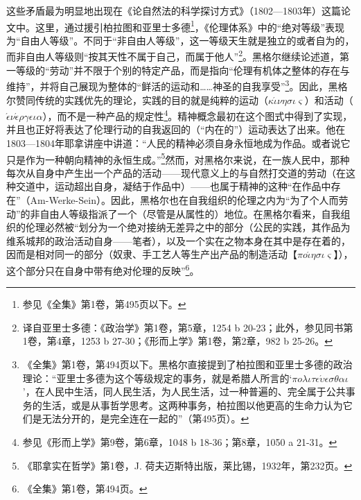这些矛盾最为明显地出现在《论自然法的科学探讨方式》（1802—1803年）这篇论文中。这里，通过援引柏拉图和亚里士多德\footnote{参见《全集》第1卷，第495页以下。}，《伦理体系》中的“绝对等级”表现为“自由人等级”。不同于“非自由人等级”，这一等级天生就是独立的或者自为的，而非自由人等级则“按其天性不属于自己，而属于他人”\footnote{译自亚里士多德：《政治学》第1卷，第5章，1254 b 20-23；此外，参见同书第1卷，第4章，1253 b 27-30；《形而上学》第1卷，第2章，982 b 25-26。}。黑格尔继续论述道，第一等级的“劳动”并不限于个别的特定产品，而是指向“伦理有机体之整体的存在与维持”，并将自己展现为整体的“鲜活的运动和……神圣的自我享受”\footnote{《全集》第1卷，第494页以下。黑格尔直接提到了柏拉图和亚里士多德的政治理论：“亚里士多德为这个等级规定的事务，就是希腊人所言的‘$\pi o \lambda \iota \tau \epsilon \acute{\upsilon} \epsilon \sigma \theta \alpha \iota$’，在人民中生活，同人民生活，为人民生活，过一种普遍的、完全属于公共事务的生活，或是从事哲学思考。这两种事务，柏拉图以他更高的生命力认为它们是无法分开的，是完全连在一起的”（第495页）。}。因此，黑格尔赞同传统的实践优先的理论，实践的目的就是纯粹的运动（$\kappa\acute{\iota}\nu\eta\sigma\iota\varsigma$）和活动（$\acute{\epsilon}\nu\acute{\epsilon}\rho\gamma\epsilon\iota\alpha$），而不是一种产品的规定性\footnote{参见《形而上学》第9卷，第6章，1048 b 18-36；第8章，1050 a 21-31。}。精神概念最初在这个图式中得到了实现，并且也正好将表达了伦理行动的自我返回的（“内在的”）运动表达了出来。他在1803—1804年耶拿讲座中讲道：“人民的精神必须自身永恒地成为作品。或者说它只是作为一种朝向精神的永恒生成。”\footnote{《耶拿实在哲学》第1卷，J. 荷夫迈斯特出版，莱比锡，1932年，第232页。}然而，对黑格尔来说，在一族人民中，那种每次从自身中产生出一个产品的活动——现代意义上的与自然打交道的劳动（在这种交道中，运动超出自身，凝结于作品中）——也属于精神的这种“在作品中存在”（Am-Werke-Sein）。因此，黑格尔也在自我组织的伦理之内为“为了个人而劳动”的非自由人等级指派了一个（尽管是从属性的）地位。在黑格尔看来，自我组织的伦理必然被“划分为一个绝对接纳无差异之中的部分（公民的实践，其作品为维系城邦的政治活动自身——笔者），以及一个实在之物本身在其中是存在着的，因而是相对同一的部分（奴隶、手工艺人等生产出产品的制造活动【$\pi o\acute{\iota}\eta\sigma\iota\varsigma$】），这个部分只在自身中带有绝对伦理的反映”\footnote{《全集》第1卷，第494页。}。


